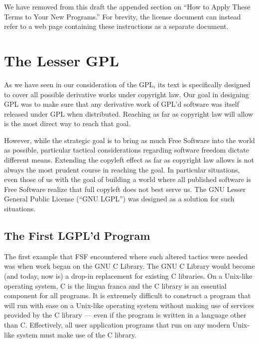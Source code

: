 
We have removed from this draft the appended section on ``How to Apply These
Terms to Your New Programs.'' For brevity, the license document can instead
refer to a web page containing these instructions as a separate document.

\chapter{The Lesser GPL}

As we have seen in our consideration of the GPL, its text is specifically
designed to cover all possible derivative works under copyright law. Our
goal in designing GPL was to make sure that any derivative work of GPL'd
software was itself released under GPL when distributed. Reaching as far
as copyright law will allow is the most direct way to reach that goal.

However, while the strategic goal is to bring as much Free Software
into the world as possible, particular tactical considerations
regarding software freedom dictate different means. Extending the
copyleft effect as far as copyright law allows is not always the most
prudent course in reaching the goal. In particular situations, even
those of us with the goal of building a world where all published
software is Free Software realize that full copyleft does not best
serve us. The GNU Lesser General Public License (``GNU LGPL'') was
designed as a solution for such situations.

\section{The First LGPL'd Program}

The first example that FSF encountered where such altered tactics were
needed was when work began on the GNU C Library. The GNU C Library would
become (and today, now is) a drop-in replacement for existing C libraries.
On a Unix-like operating system, C is the lingua franca and the C library
is an essential component for all programs. It is extremely difficult to
construct a program that will run with ease on a Unix-like operating
system without making use of services provided by the C library --- even
if the program is written in a language other than C\@. Effectively, all
user application programs that run on any modern Unix-like system must
make use of the C library.

